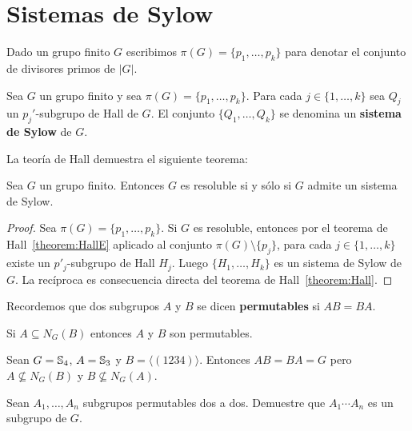 
\chapter{Sistemas de Sylow}

Dado un grupo finito $G$ escribimos $\pi(G)=\{p_1,\dots,p_k\}$ para denotar el
conjunto de divisores primos de $|G|$. 

\begin{definition}
	Sea $G$ un grupo finito y sea $\pi(G)=\{p_1,\dots,p_k\}$. Para cada $j\in
	\{1,\dots,k\}$ sea $Q_j$ un $p_j'$-subgrupo de Hall de $G$. El conjunto
	$\{Q_1,\dots,Q_k\}$ se denomina un \textbf{sistema de Sylow} de $G$.
\end{definition}

La teoría de Hall demuestra el siguiente teorema:

\begin{theorem}
	Sea $G$ un grupo finito. Entonces $G$ es resoluble si y sólo si $G$ admite
	un sistema de Sylow.	
\end{theorem}

\begin{proof}
	Sea $\pi(G)=\{p_1,\dots,p_k\}$. Si $G$ es resoluble, entonces por el
	teorema de Hall~\ref{theorem:HallE} aplicado al conjunto
	$\pi(G)\setminus\{p_j\}$, para cada $j\in\{1,\dots,k\}$ existe un
	$p'_j$-subgrupo de Hall $H_j$. Luego $\{H_1,\dots,H_k\}$ es un sistema de
	Sylow de $G$. La recíproca es consecuencia directa del teorema de
	Hall~\ref{theorem:Hall}.
\end{proof}

Recordemos que dos subgrupos $A$ y $B$ se dicen
\textbf{permutables} si $AB=BA$.

\begin{example}
	Si $A\subseteq N_G(B)$ entonces $A$ y $B$ son permutables.
\end{example}

\begin{example}
	Sean $G=\mathbb{S}_4$, $A=\mathbb{S}_3$ y $B=\langle (1234)\rangle$. Entonces $AB=BA=G$
	pero $A\not\subseteq N_G(B)$ y $B\not\subseteq N_G(A)$.
\end{example}

\begin{exercise}
	Sean $A_1,\dots,A_n$ subgrupos permutables dos a dos. Demuestre que
	$A_1\cdots A_n$ es un subgrupo de $G$.
\end{exercise}


